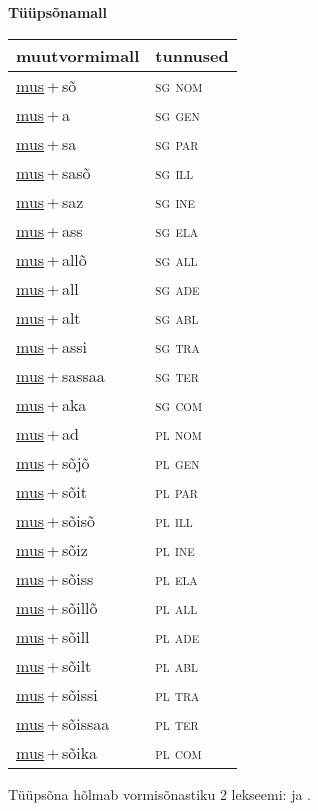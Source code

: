
\vspace{1.8em}
\begin{minipage}{\textwidth}
\textbf{Tüüpsõnamall \,}\\

\begin{sideways}
\begin{tabular}{l l}
muutvormimall & tunnused \\
\hline
\underline{mus}\,+\,sõ & \textsc{ sg nom } \\
\underline{mus}\,+\,a & \textsc{ sg gen } \\
\underline{mus}\,+\,sa & \textsc{ sg par } \\
\underline{mus}\,+\,sasõ & \textsc{ sg ill } \\
\underline{mus}\,+\,saz & \textsc{ sg ine } \\
\underline{mus}\,+\,ass & \textsc{ sg ela } \\
\underline{mus}\,+\,allõ & \textsc{ sg all } \\
\underline{mus}\,+\,all & \textsc{ sg ade } \\
\underline{mus}\,+\,alt & \textsc{ sg abl } \\
\underline{mus}\,+\,assi & \textsc{ sg tra } \\
\underline{mus}\,+\,sassaa & \textsc{ sg ter } \\
\underline{mus}\,+\,aka & \textsc{ sg com } \\
\underline{mus}\,+\,ad & \textsc{ pl nom } \\
\underline{mus}\,+\,sõjõ & \textsc{ pl gen } \\
\underline{mus}\,+\,sõit & \textsc{ pl par } \\
\underline{mus}\,+\,sõisõ & \textsc{ pl ill } \\
\underline{mus}\,+\,sõiz & \textsc{ pl ine } \\
\underline{mus}\,+\,sõiss & \textsc{ pl ela } \\
\underline{mus}\,+\,sõillõ & \textsc{ pl all } \\
\underline{mus}\,+\,sõill & \textsc{ pl ade } \\
\underline{mus}\,+\,sõilt & \textsc{ pl abl } \\
\underline{mus}\,+\,sõissi & \textsc{ pl tra } \\
\underline{mus}\,+\,sõissaa & \textsc{ pl ter } \\
\underline{mus}\,+\,sõika & \textsc{ pl com } \\
\end{tabular}
\end{sideways}
\label{tab:tüüpsõnamall-mussõ}

\end{minipage}

 
\vspace{1em}
\noindent Tüüpsõna hõlmab vormisõnastiku 2 lekseemi:  ja .
